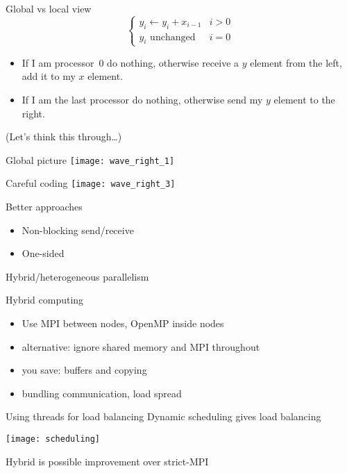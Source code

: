 \begin{numberedframe}{Global vs local view}
  \[ 
\begin{cases}
y_i\leftarrow y_i+x_{i-1}&i>0\\ \mbox{$y_i$ unchanged}&i=0
\end{cases}
\]
\begin{itemize}
\item If I am processor~0 do nothing, otherwise receive a $y$ element
  from the left, add it to my $x$ element.
\item If I am the last processor do nothing, otherwise send my $y$
  element to the right.
\end{itemize}
(Let's think this through\ldots)
\end{numberedframe}

\begin{numberedframe}{Global picture}
  \texttt{[image: wave\_right\_1]}  
\end{numberedframe}

\begin{numberedframe}{Careful coding}
  \texttt{[image: wave\_right\_3]}  
\end{numberedframe}

\begin{numberedframe}{Better approaches}
  \begin{itemize}
  \item Non-blocking send/receive
  \item One-sided
  \end{itemize}
\end{numberedframe}

 {Hybrid/heterogeneous parallelism}

\begin{numberedframe}{Hybrid computing}
  \begin{itemize}
  \item Use MPI between nodes, OpenMP inside nodes
  \item alternative: ignore shared memory and MPI throughout
  \item you save: buffers and copying
  \item bundling communication, load spread 
  \end{itemize}
\end{numberedframe}

\begin{numberedframe}{Using threads for load balancing}
  Dynamic scheduling gives load balancing

  \texttt{[image: scheduling]}

  Hybrid is possible improvement over strict-MPI
\end{numberedframe}

